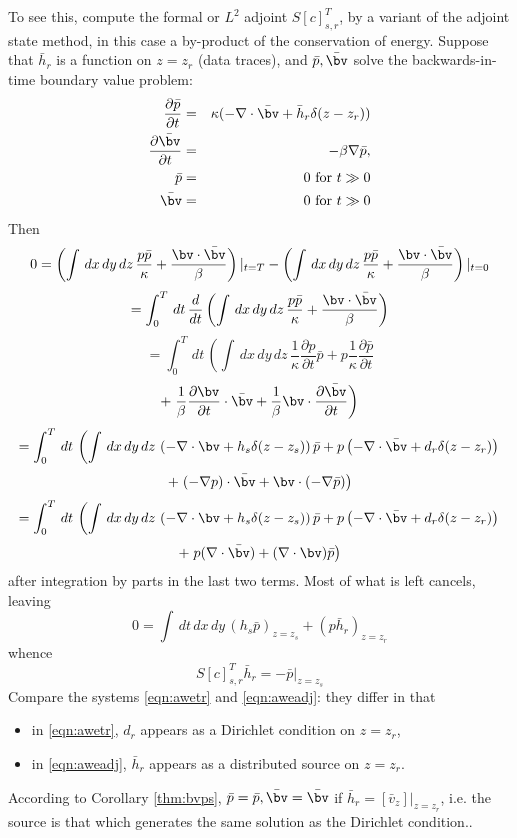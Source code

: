 To see this, compute the formal or $L^2$ adjoint $S[c]_{s,r}^T$, by a variant of the adjoint state method, in this case a by-product of the conservation of energy. Suppose that $\bar{h}_r$ is a function on $z=z_r$ (data traces), and 
$\bar{p},\bar{\bv}$ solve the backwards-in-time boundary value problem:
\begin{eqnarray}
\label{eqn:aweadj}
\frac{\partial \bar{p}}{\partial t} & = & \kappa (-\nabla \cdot \bar{\bv} + 
 \bar{h}_r \delta(z-z_r))\nonumber \\
\frac{\partial \bar{\bv}}{\partial t} & = & - \beta \nabla \bar{p},\nonumber \\
\bar{p} & =& 0 \mbox{ for } t \gg 0\nonumber\\ 
\bar{\bv} & = & 0 \mbox{ for } t \gg 0 
\end{eqnarray} 
Then
\[
0 = 
\left(\int\, dx\,dy\,dz\, \frac{p \bar{p}}{\kappa} +  
\frac{\bv \cdot \bar{\bv}}{\beta} \right)|_{t=T}
-
\left(\int\, dx\,dy\,dz\, \frac{p \bar{p}}{\kappa} +  \frac{\bv \cdot \bar{\bv}}{\beta} \right)|_{t=0}
\]
\[
= 
\int_{0}^{T} \,dt\, \frac{d}{dt}\left(\int\, dx\,dy\,dz\, \frac{p \bar{p}}{\kappa} +  \frac{\bv \cdot \bar{\bv}}{\beta} \right)
\]
\[
= 
\int_{0}^{T} \,dt\, \left(\int\, dx\,dy\,dz\, \frac{1}{\kappa} \frac{\partial p}{\partial t} \bar {p} +  p \frac{1}{\kappa}\frac{\partial \bar{p}}{\partial t} \right.
\]
\[
+
\left. \frac{1}{\beta} \frac{\partial \bv}{\partial t} \cdot \bar{\bv} + \frac{1}{\beta} \bv \cdot \frac{\partial \bar{\bv}}{\partial t} \right)
\]
\[
= 
\int_{0}^{T} \,dt\, \left(\int\, dx\,dy\,dz\, \left(- \nabla \cdot \bv + 
 h_s \delta(z-z_s)\right) \bar{p} + p \left(- \nabla \cdot \bar{\bv} + 
 d_r \delta(z-z_r)\right) \right.
\]
\[
+
\left.  (- \nabla p) \cdot \bar{\bv} + \bv \cdot (-\nabla \bar{p}) \right)
\]
\[
= 
\int_{0}^{T}\,dt\, \left(\int\, dx\,dy\,dz\, \left(- \nabla \cdot \bv + 
 h_s \delta(z-z_s)\right) \bar{p} + p \left(- \nabla \cdot \bar{\bv} + 
 d_r \delta(z-z_r)\right) \right.
\]
\[
+
\left.  p (\nabla \cdot \bar{\bv}) + (\nabla \cdot \bv) \bar{p} \right)
\]
after integration by parts in the last two terms. Most of what is left cancels, leaving 
\[
0 = \int\,dt\,dx\,dy\, (h_s \bar{p})_{z=z_s} + (p  \bar{h}_r)_{z=z_r}
\]
whence
\begin{equation}
\label{eqn:sadj}
 S[c]_{s,r}^T \bar{h}_r = -\bar{p}|_{z=z_s}
\end{equation}
Compare the systems \ref{eqn:awetr} and \ref{eqn:aweadj}: they differ in that 
\begin{itemize}
\item in \ref{eqn:awetr}, $d_r$ appears as a Dirichlet condition on $z=z_r$,
\item in \ref{eqn:aweadj}, $\bar{h}_r$ appears as a distributed source on $z=z_r$.
\end{itemize}
According to Corollary \ref{thm:bvps}, $\bar{p}=\bar{p}, \bar{\bv}=\bar{\bv}$ if $\bar{h}_r = [\bar{v}_z]|_{z=z_r}$, i.e. the source is that which generates the same solution as the Dirichlet condition..


